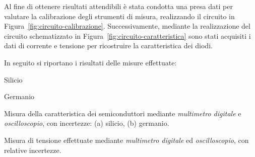 \documentclass[@MAIN@]{subfiles}
\begin{document}
    Al fine di ottenere risultati attendibili è stata condotta una presa dati per valutare la
    calibrazione degli strumenti di misura, realizzando il circuito in Figura~\ref{fig:circuito-calibrazione}. Successivamente,
    mediante la realizzazione del circuito schematizzato in Figura~\ref{fig:circuito-caratteristica}
    sono stati acquisiti i dati di corrente e tensione per ricostruire la caratteristica dei diodi.\newline

    \noindent In seguito si riportano i risultati delle misure effettuate:\newline
    \vspace{1.5pt}

    \begin{table}[ht]
        \centering
        \begin{subtable}[t]{.45\textwidth}
            \centering
            
            \captionsetup{justification=centering} %
            \caption{Silicio} %
            \label{tab:silicio}
        \end{subtable}
        \hfill
        \begin{subtable}[t]{.45\textwidth}
            \centering
            
            \captionsetup{justification=centering} %
            \caption{Germanio} %
            \label{tab:germanio}
        \end{subtable}

        \vspace{0.5pt} %

        \caption{Misura della caratteristica dei semiconduttori mediante \textit{multimetro digitale} e
        \textit{oscilloscopio}, con incertezze: (a) silicio, (b) germanio.}
        \label{tab:tabelle_semiconduttori}

    \end{table}

    \begin{table}[ht]
        \centering
        
        \caption{Misura di tensione effettuate mediante \textit{multimetro digitale} ed \textit{oscilloscopio}, con relative incertezze.}
        \label{tab:calibrazione}

    \end{table}
\end{document}
